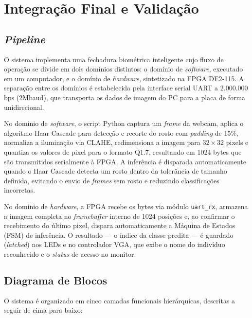 \chapter{Integração Final e Validação}

\section{\textit{Pipeline}}
O sistema implementa uma fechadura biométrica inteligente cujo fluxo de operação se divide em dois domínios distintos: o domínio de \textit{software}, executado em um computador, e o domínio de \textit{hardware}, sintetizado na FPGA DE2-115. A separação entre os domínios é estabelecida pela interface serial UART a 2.000.000
bps (2Mbaud), que transporta os dados de imagem do PC para a placa de forma unidirecional.

No domínio de \textit{software}, o script Python captura um \textit{frame} da webcam, aplica o algoritmo Haar Cascade para detecção e recorte do rosto com \textit{padding} de 15\%, normaliza a iluminação via CLAHE, redimensiona a imagem para $32 \times 32$ pixels e quantiza os valores de pixel para o formato Q1.7, resultando em 1024 bytes que são transmitidos serialmente à FPGA. A inferência é disparada automaticamente quando o Haar Cascade detecta um rosto dentro da tolerância de tamanho definida, evitando o envio de \textit{frames} sem rosto e reduzindo classificações incorretas.

No domínio de \textit{hardware}, a FPGA recebe os bytes via módulo \texttt{uart\_rx}, armazena a imagem completa no \textit{framebuffer} interno de 1024 posições e, ao confirmar o recebimento do último pixel, dispara automaticamente a Máquina de Estados (FSM) de inferência. O resultado — o índice da classe predita — é guardado (\textit{latched}) nos LEDs e no controlador VGA, que exibe o nome do indivíduo reconhecido e o \textit{status} de acesso no monitor.

\section{Diagrama de Blocos}
O sistema é organizado em cinco camadas funcionais hierárquicas, descritas a seguir de cima para baixo:


